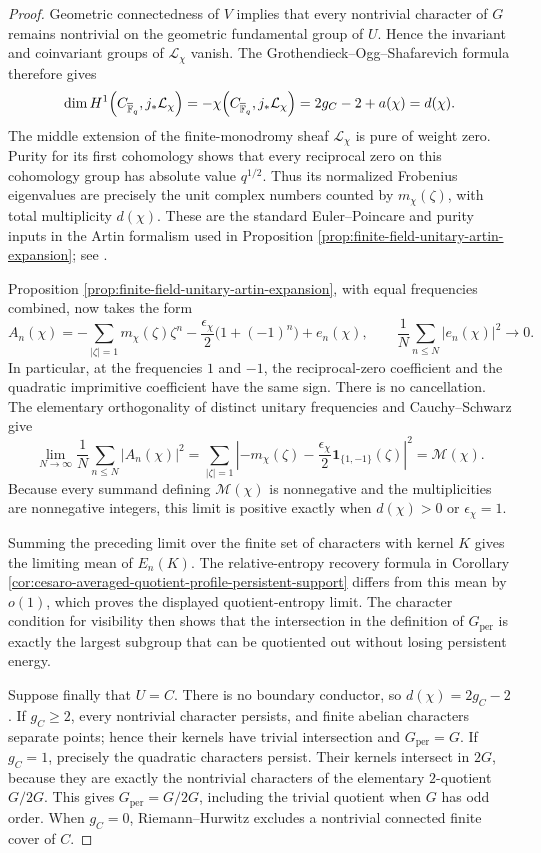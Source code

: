 \begin{proof}
Geometric connectedness of \(V\) implies that every nontrivial character of
\(G\) remains nontrivial on the geometric fundamental group of \(U\).  Hence
the invariant and coinvariant groups of \(\mathcal L_\chi\) vanish.  The
Grothendieck--Ogg--Shafarevich formula therefore gives
\[
 \dim H^1\!\left(C_{\overline{\mathbb{F}}_q},j_*\mathcal L_\chi\right)
 =-\chi\!\left(C_{\overline{\mathbb{F}}_q},j_*\mathcal L_\chi\right)
 =2g_C-2+a(\chi)=d(\chi).
\]
The middle extension of the finite-monodromy sheaf \(\mathcal L_\chi\) is
pure of weight zero.  Purity for its first cohomology shows that every
reciprocal zero on this cohomology group has absolute value \(q^{1/2}\).
Thus its normalized Frobenius eigenvalues are precisely the unit complex
numbers counted by \(m_\chi(\zeta)\), with total multiplicity \(d(\chi)\).
These are the standard Euler--Poincare and purity inputs in the Artin
formalism used in Proposition
\ref{prop:finite-field-unitary-artin-expansion}; see
\cite{DeligneSGA4half1977,Deligne1980WeilII,Milne1980Etale}.

Proposition \ref{prop:finite-field-unitary-artin-expansion}, with equal
frequencies combined, now takes the form
\[
 A_n(\chi)
 =-\sum_{|\zeta|=1}m_\chi(\zeta)\zeta^n
 -\frac{\epsilon_\chi}{2}\bigl(1+(-1)^n\bigr)
 +e_n(\chi),
 \qquad
 \frac1N\sum_{n\le N}|e_n(\chi)|^2\longrightarrow0.
\]
In particular, at the frequencies \(1\) and \(-1\), the reciprocal-zero
coefficient and the quadratic imprimitive coefficient have the same sign.
There is no cancellation.  The elementary orthogonality of distinct unitary
frequencies and Cauchy--Schwarz give
\[
 \lim_{N\to\infty}\frac1N\sum_{n\le N}|A_n(\chi)|^2
 =\sum_{|\zeta|=1}
 \left|
 -m_\chi(\zeta)
 -\frac{\epsilon_\chi}{2}\mathbf 1_{\{1,-1\}}(\zeta)
 \right|^2
 =\mathscr M(\chi).
\]
Because every summand defining \(\mathscr M(\chi)\) is nonnegative and the
multiplicities are nonnegative integers, this limit is positive exactly when
\(d(\chi)>0\) or \(\epsilon_\chi=1\).

Summing the preceding limit over the finite set of characters with kernel
\(K\) gives the limiting mean of \(E_n(K)\).  The relative-entropy recovery
formula in Corollary
\ref{cor:cesaro-averaged-quotient-profile-persistent-support} differs from
this mean by \(o(1)\), which proves the displayed quotient-entropy limit.
The character condition for visibility then shows that the intersection in
the definition of \(G_{\mathrm{per}}\) is exactly the largest subgroup that
can be quotiented out without losing persistent energy.

Suppose finally that \(U=C\).  There is no boundary conductor, so
\(d(\chi)=2g_C-2\).  If \(g_C\ge2\), every nontrivial character persists, and
finite abelian characters separate points; hence their kernels have trivial
intersection and \(G_{\mathrm{per}}=G\).  If \(g_C=1\), precisely the
quadratic characters persist.  Their kernels intersect in \(2G\), because
they are exactly the nontrivial characters of the elementary \(2\)-quotient
\(G/2G\).  This gives \(G_{\mathrm{per}}=G/2G\), including the trivial
quotient when \(G\) has odd order.  When \(g_C=0\), Riemann--Hurwitz excludes
a nontrivial connected finite \etale{} cover of \(C\).
\end{proof}

